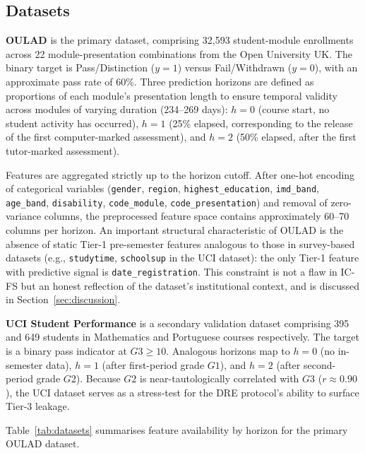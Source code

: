 \documentclass[a4paper,fleqn]{cas-sc}
\begin{document}
\subsection{Datasets}

\textbf{OULAD} \cite{kuzilek2017} is the primary dataset, comprising 32,593 student-module
enrollments across 22 module-presentation combinations from the Open University UK\@.
The binary target is Pass/Distinction ($y=1$) versus Fail/Withdrawn ($y=0$),
with an approximate pass rate of 60\%.
Three prediction horizons are defined as proportions of each module's presentation
length to ensure temporal validity across modules of varying duration (234--269 days):
$h=0$ (course start, no student activity has occurred),
$h=1$ (25\% elapsed, corresponding to the release of the first computer-marked
assessment), and $h=2$ (50\% elapsed, after the first tutor-marked assessment).

Features are aggregated strictly up to the horizon cutoff.
After one-hot encoding of categorical variables (\texttt{gender}, \texttt{region},
\texttt{highest\_education}, \texttt{imd\_band}, \texttt{age\_band},
\texttt{disability}, \texttt{code\_module}, \texttt{code\_presentation})
and removal of zero-variance columns, the preprocessed feature space contains
approximately 60--70 columns per horizon.
An important structural characteristic of OULAD is the absence of static
Tier-1 pre-semester features analogous to those in survey-based datasets
(e.g., \texttt{studytime}, \texttt{schoolsup} in the UCI dataset):
the only Tier-1 feature with predictive signal is \texttt{date\_registration}.
This constraint is not a flaw in IC-FS but an honest reflection of the dataset's
institutional context, and is discussed in Section~\ref{sec:discussion}.

\textbf{UCI Student Performance} \cite{cortez2008} is a secondary validation dataset
comprising 395 and 649 students in Mathematics and Portuguese courses respectively.
The target is a binary pass indicator at $G3 \geq 10$.
Analogous horizons map to $h=0$ (no in-semester data), $h=1$ (after first-period
grade $G1$), and $h=2$ (after second-period grade $G2$).
Because $G2$ is near-tautologically correlated with $G3$ ($r \approx 0.90$),
the UCI dataset serves as a stress-test for the DRE protocol's ability to surface
Tier-3 leakage.

Table~\ref{tab:datasets} summarises feature availability by horizon for the primary
OULAD dataset.
\end{document}
